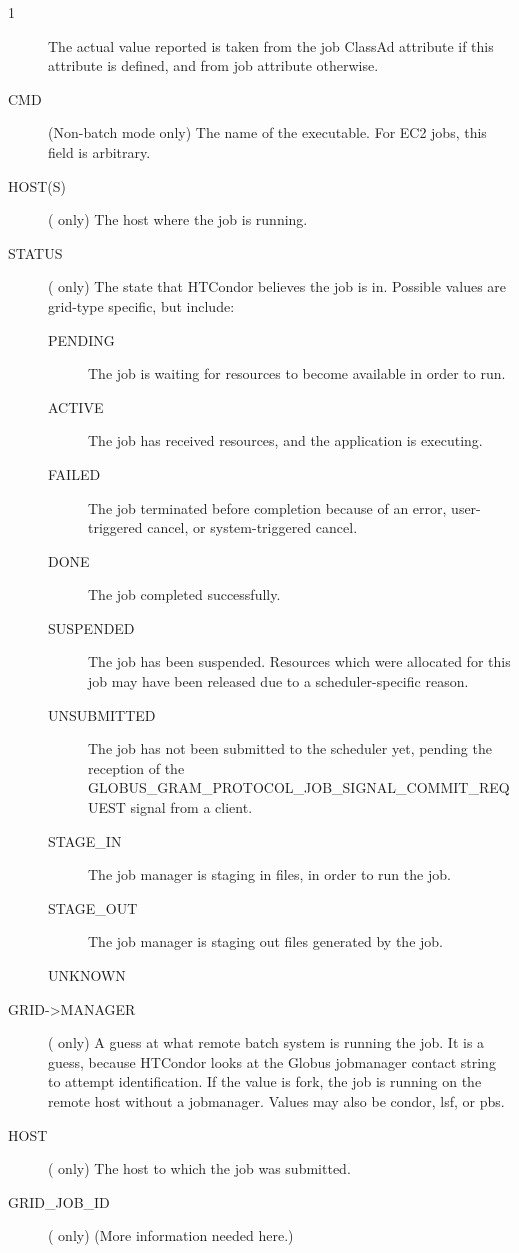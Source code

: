 \begin{ManPage}{\label{man-condor-q}}{1}
\begin{description}
	The actual value reported is taken from the job ClassAd attribute
	 if this attribute is defined, and from job
	attribute  otherwise.
\item[CMD] (Non-batch mode only) The name of the executable.  For EC2 jobs,
    this field is arbitrary.
\item[HOST(S)] ( only) The host where the job is running.
\item[STATUS] ( only) The state that HTCondor believes the job is in.
Possible values are grid-type specific, but include:
  \begin{description}
    \item[PENDING] The job is waiting for resources to become available
    in order to run.
    \item[ACTIVE] The job has received resources, and the application
    is executing.
    \item[FAILED] The job terminated before completion because of an error,
    user-triggered cancel, or system-triggered cancel.
    \item[DONE] The job completed successfully.
    \item[SUSPENDED] The job has been suspended.
    Resources which were allocated for this job may have been
    released due to a scheduler-specific reason.
    \item[UNSUBMITTED] The job has not been submitted to the scheduler yet,
    pending the reception of the 
    GLOBUS\_GRAM\_PROTOCOL\_JOB\_SIGNAL\_COMMIT\_REQUEST signal from a client.
    \item[STAGE\_IN] The job manager is staging in files,
    in order to run the job.
    \item[STAGE\_OUT] The job manager is staging out files
    generated by the job.
    \item[UNKNOWN]
  \end{description}
\item[GRID->MANAGER] 
  ( only) A guess at what remote batch system is running the job.
  It is a guess, because HTCondor looks at the Globus jobmanager contact
  string to attempt identification.
  If the value is fork, the job is running on the
  remote host without a jobmanager.
  Values may also be condor, lsf, or pbs.
\item[HOST] ( only) The host to which the job was submitted.
\item[GRID\_JOB\_ID] ( only) (More information needed here.)

\end{description}
\end{ManPage}
